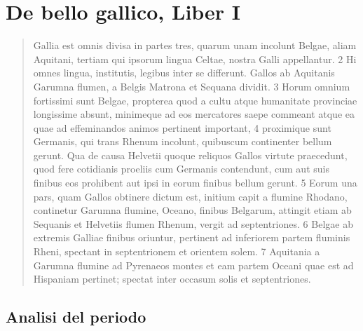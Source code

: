 \documentclass[10pt,a4paper]{article}
\begin{document}
	\section{De bello gallico, Liber I}

	\begin{quote}
		Gallia est omnis divisa in partes tres, quarum unam incolunt Belgae, aliam Aquitani, tertiam qui ipsorum lingua Celtae, nostra Galli appellantur. 2 Hi omnes lingua, institutis, legibus inter se differunt. Gallos ab Aquitanis Garumna flumen, a Belgis Matrona et Sequana dividit. 3 Horum omnium fortissimi sunt Belgae, propterea quod a cultu atque humanitate provinciae longissime absunt, minimeque ad eos mercatores saepe commeant atque ea quae ad effeminandos animos pertinent important, 4 proximique sunt Germanis, qui trans Rhenum incolunt, quibuscum continenter bellum gerunt. Qua de causa Helvetii quoque reliquos Gallos virtute praecedunt, quod fere cotidianis proeliis cum Germanis contendunt, cum aut suis finibus eos prohibent aut ipsi in eorum finibus bellum gerunt. 5 Eorum una pars, quam Gallos obtinere dictum est, initium capit a flumine Rhodano, continetur Garumna flumine, Oceano, finibus Belgarum, attingit etiam ab Sequanis et Helvetiis flumen Rhenum, vergit ad septentriones. 6 Belgae ab extremis Galliae finibus oriuntur, pertinent ad inferiorem partem fluminis Rheni, spectant in septentrionem et orientem solem. 7 Aquitania a Garumna flumine ad Pyrenaeos montes et eam partem Oceani quae est ad Hispaniam pertinet; spectat inter occasum solis et septentriones.
	\end{quote}

	\subsection{Analisi del periodo}
\end{document}
